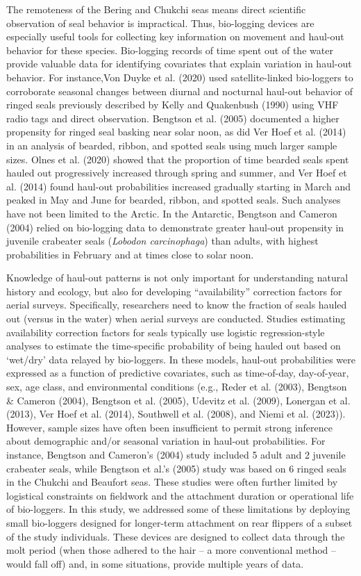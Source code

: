 \documentclass[fleqn,10pt,lineno]{wlpeerj} %
\begin{document}
The remoteness of the Bering and Chukchi seas means direct scientific
observation of seal behavior is impractical. Thus, bio-logging devices are
especially useful tools for collecting key information on movement and haul-out
behavior for these species. Bio-logging records of time spent out of the water
provide valuable data for identifying covariates that explain variation in
haul-out behavior. For instance,Von Duyke et al. (2020) used
satellite-linked bio-loggers to corroborate seasonal changes between diurnal and
nocturnal haul-out behavior of ringed seals previously described by Kelly and
Quakenbush (1990) using VHF radio tags and direct observation. Bengtson
et al. (2005) documented a higher propensity for ringed seal basking
near solar noon, as did Ver Hoef et al. (2014) in an analysis of
bearded, ribbon, and spotted seals using much larger sample sizes. Olnes et al.
(2020) showed that the proportion of time bearded seals spent hauled out
progressively increased through spring and summer, and Ver Hoef et al.
(2014) found haul-out probabilities increased gradually starting in
March and peaked in May and June for bearded, ribbon, and spotted seals. Such
analyses have not been limited to the Arctic. In the Antarctic, Bengtson and
Cameron (2004) relied on bio-logging data to demonstrate greater
haul-out propensity in juvenile crabeater seals (\emph{Lobodon carcinophaga}) than
adults, with highest probabilities in February and at times close to solar noon.

Knowledge of haul-out patterns is not only important for understanding natural
history and ecology, but also for developing ``availability'' correction factors
for aerial surveys. Specifically, researchers need to know the fraction of seals
hauled out (versus in the water) when aerial surveys are conducted. Studies
estimating availability correction factors for seals typically use logistic
regression-style analyses to estimate the time-specific probability of being
hauled out based on `wet/dry' data relayed by bio-loggers. In these models,
haul-out probabilities were expressed as a function of predictive covariates,
such as time-of-day, day-of-year, sex, age class, and environmental conditions
(e.g., Reder et al. (2003), Bengtson \& Cameron (2004), Bengtson et al. (2005), Udevitz et al. (2009), Lonergan et al. (2013),
Ver Hoef et al. (2014), Southwell et al. (2008), and Niemi et al. (2023)). However, sample sizes have often been
insufficient to permit strong inference about demographic and/or seasonal
variation in haul-out probabilities. For instance, Bengtson and Cameron's
(2004) study included 5 adult and 2 juvenile crabeater seals, while
Bengtson et al.'s (2005) study was based on 6 ringed seals in the
Chukchi and Beaufort seas. These studies were often further limited by
logistical constraints on fieldwork and the attachment duration or operational
life of bio-loggers. In this study, we addressed some of these limitations by
deploying small bio-loggers designed for longer-term attachment on rear flippers
of a subset of the study individuals. These devices are designed to collect data
through the molt period (when those adhered to the hair -- a more conventional
method -- would fall off) and, in some situations, provide multiple years of
data.
\end{document}
